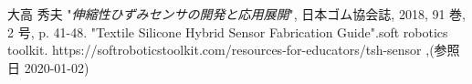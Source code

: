 \pagebreak

\begin{thebibliography}{99}


大高 秀夫 "{\it 伸縮性ひずみセンサの開発と応用展開}", 日本ゴム協会誌, 2018, 91 巻, 2 号, p. 41-48.
 "Textile Silicone Hybrid Sensor Fabrication \newline Guide".soft robotics toolkit. \newline https://softroboticstoolkit.com/resources-for-educators/tsh-sensor ,(参照日 2020-01-02)

\end{thebibliography}